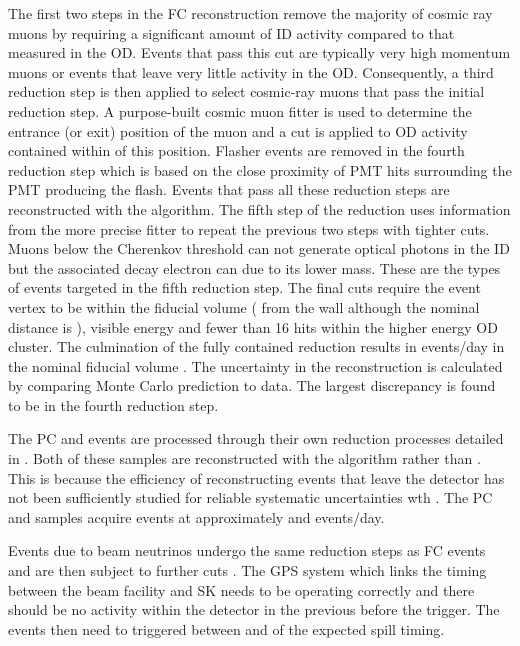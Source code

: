 The first two steps in the FC reconstruction remove the majority of cosmic ray muons by requiring a significant amount of ID activity compared to that measured in the OD. Events that pass this cut are typically very high momentum muons or events that leave very little activity in the OD. Consequently, a third reduction step is then applied to select cosmic-ray muons that pass the initial reduction step. A purpose-built cosmic muon fitter is used to determine the entrance (or exit) position of the muon and a cut is applied to OD activity contained within  of this position. Flasher events are removed in the fourth reduction step which is based on the close proximity of PMT hits surrounding the PMT producing the flash. Events that pass all these reduction steps are reconstructed with the \apfit algorithm. The fifth step of the reduction uses information from the more precise fitter to repeat the previous two steps with tighter cuts. Muons below the Cherenkov threshold can not generate optical photons in the ID but the associated decay electron can due to its lower mass. These are the types of events targeted in the fifth reduction step. The final cuts require the event vertex to be within the fiducial volume ( from the wall although the nominal distance is ), visible energy  and fewer than 16 hits within the higher energy OD cluster. The culmination of the fully contained reduction results in  events/day in the nominal fiducial volume \cite{thesis_miao}. The uncertainty in the reconstruction is calculated by comparing Monte Carlo prediction to data. The largest discrepancy is found to be  in the fourth reduction step.

The PC and  events are processed through their own reduction processes detailed in \cite{Ashie_2005}. Both of these samples are reconstructed with the \apfit algorithm rather than \fq. This is because the efficiency of reconstructing events that leave the detector has not been sufficiently studied for reliable systematic uncertainties wth \fq. The PC and  samples acquire events at approximately  and  events/day.

Events due to beam neutrinos undergo the same reduction steps as FC events and are then subject to further cuts \cite{t2k_tn_027}. The GPS system which links the timing between the beam facility and SK needs to be operating correctly and there should be no activity within the detector in the previous  before the trigger. The events then need to triggered between  and  of the expected spill timing.

